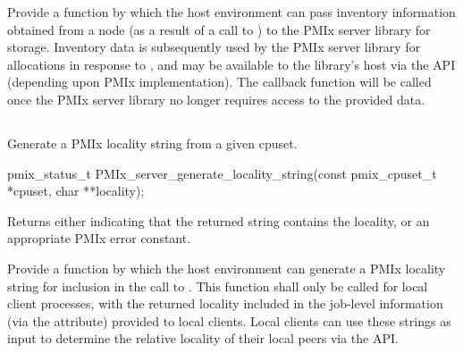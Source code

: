 \descr

Provide a function by which the host environment can pass inventory information obtained from a node (as a result of a call to ) to the \ac{PMIx} server library for storage. Inventory data is subsequently used by the \ac{PMIx} server library for allocations in response to , and may be available to the library's host via the  \ac{API} (depending upon \ac{PMIx} implementation). The  callback function will be called once the \ac{PMIx} server library no longer requires access to the provided data.

\subsection{}

\summary

Generate a \ac{PMIx} locality string from a given cpuset.

\format

\cspecificstart
\begin{codepar}
pmix_status_t
PMIx_server_generate_locality_string(const pmix_cpuset_t *cpuset,
                                     char **locality);
\end{codepar}
\cspecificend

\begin{arglist}
\end{arglist}

Returns either  indicating that the returned string contains the locality, or an appropriate \ac{PMIx} error constant.


\descr

Provide a function by which the host environment can generate a \ac{PMIx} locality string for inclusion in the call to . This function shall only be called for local client processes, with the returned locality included in the job-level information (via the  attribute) provided to local clients. Local clients can use these strings as input to determine the relative locality of their local peers via the  \ac{API}.

